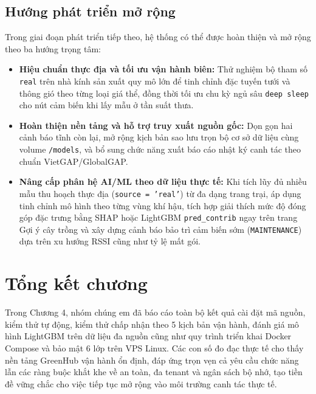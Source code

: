 \subsection{Hướng phát triển mở rộng}

Trong giai đoạn phát triển tiếp theo, hệ thống có thể được hoàn thiện và mở rộng theo ba hướng trọng tâm:
\begin{itemize}[leftmargin=*]
    \item \textbf{Hiệu chuẩn thực địa và tối ưu vận hành biên:} Thử nghiệm bộ tham số \texttt{real} trên nhà kính sản xuất quy mô lớn để tinh chỉnh đặc tuyến tưới và thông gió theo từng loại giá thể, đồng thời tối ưu chu kỳ ngủ sâu \texttt{deep sleep} cho nút cảm biến khi lấy mẫu ở tần suất thưa.
    \item \textbf{Hoàn thiện nền tảng và hỗ trợ truy xuất nguồn gốc:} Dọn gọn hai cảnh báo tĩnh còn lại, mở rộng kịch bản sao lưu trọn bộ cơ sở dữ liệu cùng volume \texttt{/models}, và bổ sung chức năng xuất báo cáo nhật ký canh tác theo chuẩn VietGAP/GlobalGAP.
    \item \textbf{Nâng cấp phân hệ AI/ML theo dữ liệu thực tế:} Khi tích lũy đủ nhiều mẫu thu hoạch thực địa (\texttt{source = 'real'}) từ đa dạng trang trại, áp dụng tinh chỉnh mô hình theo từng vùng khí hậu, tích hợp giải thích mức độ đóng góp đặc trưng bằng SHAP hoặc LightGBM \texttt{pred\_contrib} ngay trên trang Gợi ý cây trồng và xây dựng cảnh báo bảo trì cảm biến sớm (\texttt{MAINTENANCE}) dựa trên xu hướng RSSI cũng như tỷ lệ mất gói.
\end{itemize}

\section{Tổng kết chương}
\label{sec:c4-summary}

Trong Chương 4, nhóm chúng em đã báo cáo toàn bộ kết quả cài đặt mã nguồn, kiểm thử tự động, kiểm thử chấp nhận theo 5 kịch bản vận hành, đánh giá mô hình LightGBM trên dữ liệu đa nguồn cũng như quy trình triển khai Docker Compose và bảo mật 6 lớp trên VPS Linux. Các con số đo đạc thực tế cho thấy nền tảng GreenHub vận hành ổn định, đáp ứng trọn vẹn cả yêu cầu chức năng lẫn các ràng buộc khắt khe về an toàn, đa tenant và ngân sách bộ nhớ, tạo tiền đề vững chắc cho việc tiếp tục mở rộng vào môi trường canh tác thực tế.
